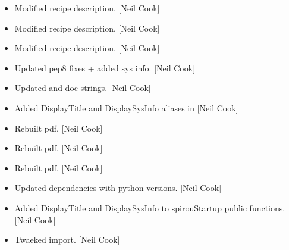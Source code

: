 \documentclass[a4paper,10pt,english]{report}
\begin{document}
\begin{itemize}
\item {} 
Modified recipe description. {[}Neil Cook{]}

\item {} 
Modified recipe description. {[}Neil Cook{]}

\item {} 
Modified recipe description. {[}Neil Cook{]}

\item {} 
Updated pep8 fixes + added sys info. {[}Neil Cook{]}

\item {} 
Updated  and  doc strings. {[}Neil Cook{]}

\item {} 
Added DisplayTitle and DisplaySysInfo aliases in  {[}Neil Cook{]}

\item {} 
Rebuilt pdf. {[}Neil Cook{]}

\item {} 
Rebuilt pdf. {[}Neil Cook{]}

\item {} 
Rebuilt pdf. {[}Neil Cook{]}

\item {} 
Updated dependencies with python versions. {[}Neil Cook{]}

\item {} 
Added DisplayTitle and DisplaySysInfo to spirouStartup public
functions. {[}Neil Cook{]}

\item {} 
Twaeked import. {[}Neil Cook{]}

\end{itemize}
\end{document}
